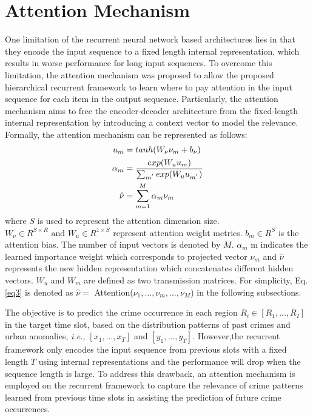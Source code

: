 \section{Attention Mechanism}

One limitation of the recurrent neural network based architectures
lies in that they encode the input sequence to a fixed length internal
representation, which results in worse performance for long input
sequences. To overcome this limitation, the attention mechanism was proposed to allow the proposed hierarchical recurrent
framework to learn where to pay attention in the input sequence
for each item in the output sequence. Particularly, the attention
mechanism aims to free the encoder-decoder architecture from the
fixed-length internal representation by introducing a context vector
to model the relevance. Formally, the attention mechanism can be
represented as follows:
\small
\begin{align}
            u_m &= tanh(W_\nu\nu_m + b_\nu)\notag\\
            \alpha_m &= \frac{exp(W_uu_m)}{\sum_{m^{'}}exp(W_uu_{m^{'}})}\notag\\
            \hat{\nu} &= \sum_{m=1}^M\alpha_m\nu_m \label{eq3}
\end{align}
where $S$ is used to represent the attention dimension size. \(W_\nu \in R^{S\times R} \text{ and } W_u \in R^{1\times S}\) represent attention weight metrics. $b_m \in R^S$ is the attention bias. The number of input vectors is denoted by $M$. $\alpha_m$ m indicates the learned importance weight which corresponds to projected vector $\nu_m$ and $\hat{\nu}$ represents the new hidden representation which concatenates different hidden vectors. $W_u$ and $W_m$ are defined as two transmission matrices. For simplicity, Eq. \ref{eq3} is denoted as $\hat{\nu} = $ Attention($\nu_1,...,\nu_m,...,\nu_M$) in the following subsections. 

The objective is to predict the crime occurrence in each region \(R_i \in [R_1,...,R_I]\) in the target time slot, based on the distribution
patterns of past crimes and urban anomalies, \emph{i.e.,} $[x_1,...,x_T]$ and $[y_1,...,y_T]$. However,the recurrent framework only encodes the input sequence from previous slots with a fixed length $T$ using internal representations and the performance will drop when the sequence length is large. To address this drawback, an attention mechanism is employed on the recurrent framework to
capture the relevance of crime patterns learned from previous time
slots in assisting the prediction of future crime occurrences.

